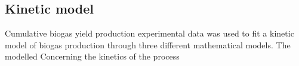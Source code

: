 \subsection{Kinetic model}
Cumulative biogas yield production experimental data was used to fit a kinetic model of biogas production through three different mathematical models. The modelled 
Concerning the kinetics of the process